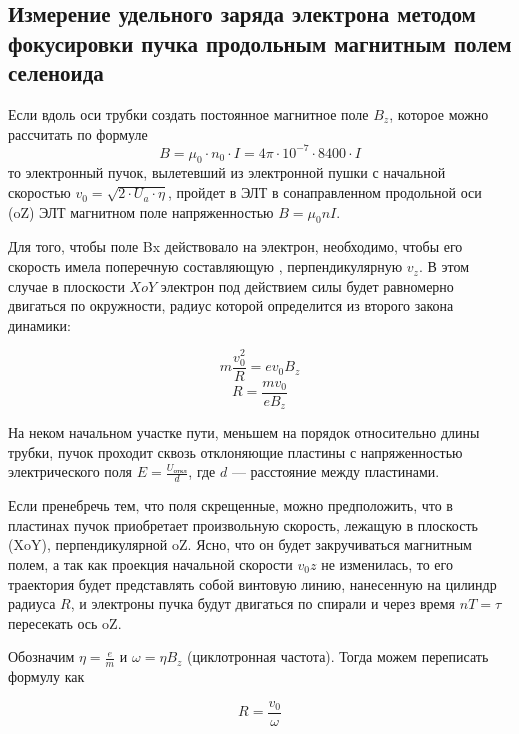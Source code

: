 \newpage

\subsection{Измерение удельного заряда электрона методом фокусировки пучка продольным магнитным полем селеноида}

Если вдоль оси трубки создать постоянное магнитное поле $B_z$, которое можно рассчитать по формуле
\begin{equation}
	B=\mu_0\cdot{}n_0\cdot{}I=4\pi\cdot10^{-7}\cdot8400\cdot{}I
\end{equation}
то электронный пучок, вылетевший из электронной пушки с начальной скоростью $v_0=\sqrt{2\cdot{U_a}\cdot\eta}$, пройдет в ЭЛТ в сонаправленном продольной оси (oZ) ЭЛТ магнитном поле напряженностью $B=\mu_0nI$. 

Для того, чтобы поле Bx действовало на электрон, необходимо, чтобы его скорость имела поперечную составляющую , перпендикулярную $v_z$. В этом случае в плоскости $XoY$ электрон под действием силы  будет равномерно двигаться по окружности, радиус которой определится из второго закона динамики:

\begin{equation}
	m\frac{v_0^2}{R}=ev_0B_z
\end{equation}
\begin{equation}
	R=\frac{mv_0}{eB_z}
\end{equation}

На неком начальном участке пути, меньшем на порядок относительно длины трубки, пучок проходит сквозь отклоняющие пластины с напряженностью электрического поля $E=\frac{U_\text{откл}}{d}$, где $d$ --- расстояние между пластинами.

Если пренебречь тем, что поля скрещенные, можно предположить, что в пластинах пучок приобретает произвольную скорость, лежащую в плоскость (XoY), перпендикулярной oZ. Ясно, что он будет закручиваться магнитным полем, а так как проекция начальной скорости $v_0z$ не изменилась, то
его траектория будет представлять собой винтовую линию, нанесенную на цилиндр радиуса $R$, и электроны пучка будут двигаться по спирали и через время $nT=\tau$ пересекать ось oZ.

Обозначим $\eta=\frac{e}{m}$ и $\omega=\eta{}B_z$ (циклотронная частота). Тогда можем переписать формулу как

\begin{equation}
	R=\frac{v_0}{\omega}
\end{equation}

